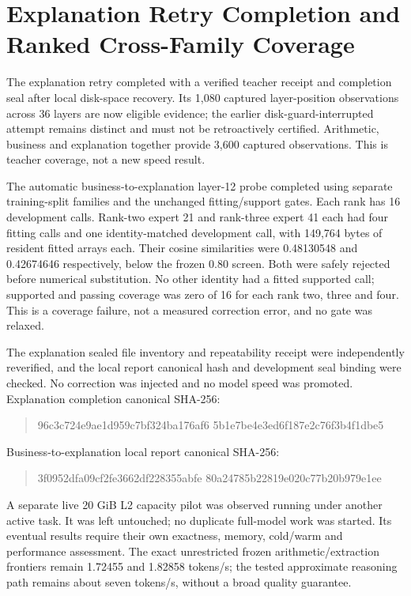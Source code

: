 \section{Explanation Retry Completion and Ranked Cross-Family Coverage}
The explanation retry completed with a verified teacher receipt and completion
seal after local disk-space recovery. Its 1,080 captured layer-position
observations across 36 layers are now eligible evidence; the earlier
disk-guard-interrupted attempt remains distinct and must not be retroactively
certified. Arithmetic, business and explanation together provide 3,600
captured observations. This is teacher coverage, not a new speed result.

The automatic business-to-explanation layer-12 probe completed using separate
training-split families and the unchanged fitting/support gates. Each rank
has 16 development calls. Rank-two expert 21 and rank-three expert 41 each
had four fitting calls and one identity-matched development call, with
149,764 bytes of resident fitted arrays each. Their cosine similarities were
0.48130548 and 0.42674646 respectively, below the frozen 0.80 screen. Both
were safely rejected before numerical substitution. No other identity had a
fitted supported call; supported and passing coverage was zero of 16 for
each rank two, three and four. This is a coverage failure, not a measured
correction error, and no gate was relaxed.

The explanation sealed file inventory and repeatability receipt were
independently reverified, and the local report canonical hash and development
seal binding were checked. No correction was injected and no model speed
was promoted. Explanation completion canonical SHA-256:
\begin{quote}\ttfamily\small
96c3c724e9ae1d959c7bf324ba176af6\allowbreak
5b1e7be4e3ed6f187e2c76f3b4f1dbe5
\end{quote}
Business-to-explanation local report canonical SHA-256:
\begin{quote}\ttfamily\small
3f0952dfa09cf2fe3662df228355abfe\allowbreak
80a24785b22819e020c77b20b979e1ee
\end{quote}

A separate live 20 GiB L2 capacity pilot was observed running under another
active task. It was left untouched; no duplicate full-model work was started.
Its eventual results require their own exactness, memory, cold/warm and
performance assessment. The exact unrestricted frozen arithmetic/extraction
frontiers remain 1.72455 and 1.82858 tokens/s; the tested approximate reasoning
path remains about seven tokens/s, without a broad quality guarantee.

